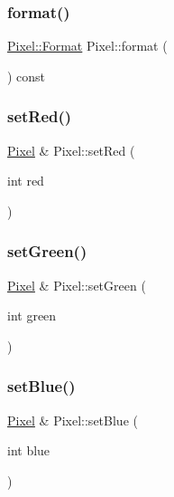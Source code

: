 \subsubsection{\texorpdfstring{format()}{format()}}
{\footnotesize\ttfamily \mbox{\hyperlink{class_pixel_aa1531d5d16ab3ab809a8e071145f0a50}{Pixel\+::\+Format}} Pixel\+::format (\begin{DoxyParamCaption}{ }\end{DoxyParamCaption}) const}

\mbox{\label{class_pixel_ae0c6a2b07578ee6b54512629b1822195}} 
\subsubsection{\texorpdfstring{setRed()}{setRed()}}
{\footnotesize\ttfamily \mbox{\hyperlink{class_pixel}{Pixel}} \& Pixel\+::set\+Red (\begin{DoxyParamCaption}\item[{int}]{red }\end{DoxyParamCaption})}

\mbox{\label{class_pixel_a7779ebd5228cd4cde61ebca23b0b4e53}} 
\subsubsection{\texorpdfstring{setGreen()}{setGreen()}}
{\footnotesize\ttfamily \mbox{\hyperlink{class_pixel}{Pixel}} \& Pixel\+::set\+Green (\begin{DoxyParamCaption}\item[{int}]{green }\end{DoxyParamCaption})}

\mbox{\label{class_pixel_a3e2e996b337f3ae3e2dcbb748c91abad}} 
\subsubsection{\texorpdfstring{setBlue()}{setBlue()}}
{\footnotesize\ttfamily \mbox{\hyperlink{class_pixel}{Pixel}} \& Pixel\+::set\+Blue (\begin{DoxyParamCaption}\item[{int}]{blue }\end{DoxyParamCaption})}

